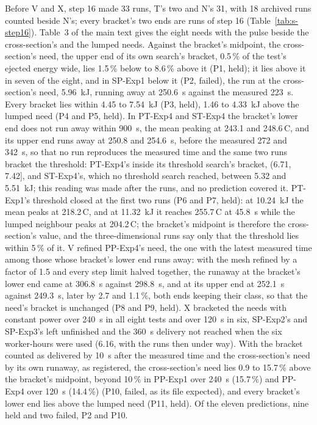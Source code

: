\documentclass[preprint,12pt]{elsarticle}
\newcommand{\degC}{\,\textdegree C}
\begin{document}
Before V and X, step 16 made 33 runs, T's two and N's 31, with 18 archived runs counted beside N's; every bracket's two ends are runs of step 16 (Table~\ref{tab:s-step16}). Table~3 of the main text gives the eight needs with the pulse beside the cross-section's and the lumped needs. Against the bracket's midpoint, the cross-section's need, the upper end of its own search's bracket, 0.5\,\% of the test's ejected energy wide, lies 1.5\,\% below to 8.6\,\% above it (P1, held); it lies above it in seven of the eight, and in SP-Exp1 below it (P2, failed), the run at the cross-section's need, 5.96~kJ, running away at 250.6~s against the measured 223~s. Every bracket lies within 4.45 to 7.54~kJ (P3, held), 1.46 to 4.33~kJ above the lumped need (P4 and P5, held). In PT-Exp4 and ST-Exp4 the bracket's lower end does not run away within 900~s, the mean peaking at 243.1 and 248.6\degC, and its upper end runs away at 250.8 and 254.6~s, before the measured 272 and 342~s, so that no run reproduces the measured time and the same two runs bracket the threshold: PT-Exp4's inside its threshold search's bracket, (6.71, 7.42], and ST-Exp4's, which no threshold search reached, between 5.32 and 5.51~kJ; this reading was made after the runs, and no prediction covered it. PT-Exp1's threshold closed at the first two runs (P6 and P7, held): at 10.24~kJ the mean peaks at 218.2\degC, and at 11.32~kJ it reaches 255.7\degC{} at 45.8~s while the lumped neighbour peaks at 204.2\degC; the bracket's midpoint is therefore the cross-section's value, and the three-dimensional runs say only that the threshold lies within 5\,\% of it. V refined PP-Exp4's need, the one with the latest measured time among those whose bracket's lower end runs away: with the mesh refined by a factor of 1.5 and every step limit halved together, the runaway at the bracket's lower end came at 306.8~s against 298.8~s, and at its upper end at 252.1~s against 249.3~s, later by 2.7 and 1.1\,\%, both ends keeping their class, so that the need's bracket is unchanged (P8 and P9, held). X bracketed the needs with constant power over 240~s in all eight tests and over 120~s in six, SP-Exp2's and SP-Exp3's left unfinished and the 360~s delivery not reached when the six worker-hours were used (6.16, with the runs then under way). With the bracket counted as delivered by 10~s after the measured time and the cross-section's need by its own runaway, as registered, the cross-section's need lies 0.9 to 15.7\,\% above the bracket's midpoint, beyond 10\,\% in PP-Exp1 over 240~s (15.7\,\%) and PP-Exp4 over 120~s (14.4\,\%) (P10, failed, as its file expected), and every bracket's lower end lies above the lumped need (P11, held). Of the eleven predictions, nine held and two failed, P2 and P10.
\end{document}
